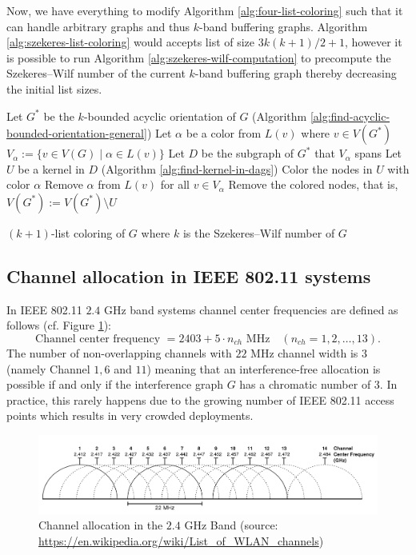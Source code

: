 \documentclass[a4paper, 12pt]{article}
\begin{document}
Now, we have everything to modify Algorithm \ref{alg:four-list-coloring} such that it can handle arbitrary graphs and thus $k$-band buffering graphs. Algorithm \ref{alg:szekeres-list-coloring} would accepts list of size $3k(k+1)/2+1$, however it is possible to run Algorithm \ref{alg:szekeres-wilf-computation} to precompute the Szekeres\---Wilf number of the current $k$-band buffering graph thereby decreasing the initial list sizes.

\begin{algorithm}[h!]\label{alg:szekeres-list-coloring}
  Let $G^*$ be the $k$-bounded acyclic orientation of $G$  (Algorithm \ref{alg:find-acyclic-bounded-orientation-general})\;
   {
  	Let $\alpha$ be a color from $L(v)$ where $v \in V(G^*)$\;
  	$V_\alpha := \lbrace v \in V(G) \mid \alpha \in L(v) \rbrace$\;
  	Let $D$ be the subgraph of $G^*$ that $V_\alpha$ spans\;
  	Let $U$ be a kernel in $D$ (Algorithm \ref{alg:find-kernel-in-dags})\;
  	Color the nodes in $U$ with color $\alpha$\;
  	Remove $\alpha$ from $L(v)$ for all $v \in V_\alpha$\;
  	Remove the colored nodes, that is, $V(G^*) := V(G^*) \setminus U$\;
  }
 \caption{$(k+1)$-list coloring of $G$ where $k$ is the Szekeres\---Wilf number of $G$}
\end{algorithm}

\subsection{Channel allocation in IEEE 802.11 systems}
In IEEE 802.11 $2.4$ GHz band systems channel center frequencies are defined as follows \cite{ieee80211} (cf. Figure \ref{fig:channel-allocation}):
$$\text{Channel center frequency } = 2403 + 5\cdot n_{ch} \text{ MHz} \quad (n_{ch} = 1,2,\ldots, 13).$$
The number of non-overlapping channels with $22$ MHz channel width is $3$ (namely Channel $1, 6$ and $11$) meaning that an interference-free allocation is possible if and only if the interference graph $G$ has a chromatic number of $3$. In practice, this rarely happens due to the growing number of IEEE 802.11 access points which results in very crowded deployments.
\begin{figure}[!h]
\centering
\includegraphics[scale=0.3]{figures/wifi-freq.png}
\caption{Channel allocation in the $2.4$ GHz Band (source: \url{https://en.wikipedia.org/wiki/List_of_WLAN_channels})}\label{fig:channel-allocation}
\end{figure}
\end{document}

